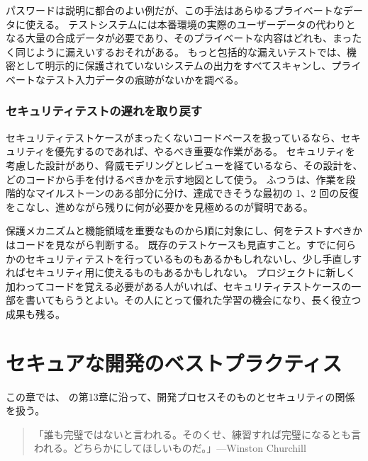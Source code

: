 \documentclass[uplatex]{jsarticle}
\begin{document}
パスワードは説明に都合のよい例だが、この手法はあらゆるプライベートなデータに使える。
テストシステムには本番環境の実際のユーザーデータの代わりとなる大量の合成データが必要であり、そのプライベートな内容はどれも、まったく同じように漏えいするおそれがある。
もっと包括的な漏えいテストでは、機密として明示的に保護されていないシステムの出力をすべてスキャンし、プライベートなテスト入力データの痕跡がないかを調べる。

\subsubsection{セキュリティテストの遅れを取り戻す}

セキュリティテストケースがまったくないコードベースを扱っているなら、セキュリティを優先するのであれば、やるべき重要な作業がある。
セキュリティを考慮した設計があり、脅威モデリングとレビューを経ているなら、その設計を、どのコードから手を付けるべきかを示す地図として使う。
ふつうは、作業を段階的なマイルストーンのある部分に分け、達成できそうな最初の 1、2 回の反復をこなし、進めながら残りに何が必要かを見極めるのが賢明である。

保護メカニズムと機能領域を重要なものから順に対象にし、何をテストすべきかはコードを見ながら判断する。
既存のテストケースも見直すこと。すでに何らかのセキュリティテストを行っているものもあるかもしれないし、少し手直しすればセキュリティ用に使えるものもあるかもしれない。
プロジェクトに新しく加わってコードを覚える必要がある人がいれば、セキュリティテストケースの一部を書いてもらうとよい。その人にとって優れた学習の機会になり、長く役立つ成果も残る。

\newpage

\section{セキュアな開発のベストプラクティス}

この章では、\cite{Kohnfelder2021} の第13章に沿って、開発プロセスそのものとセキュリティの関係を扱う。

\begin{quote}
「誰も完璧ではないと言われる。そのくせ、練習すれば完璧になるとも言われる。どちらかにしてほしいものだ。」---Winston Churchill
\end{quote}
\end{document}
